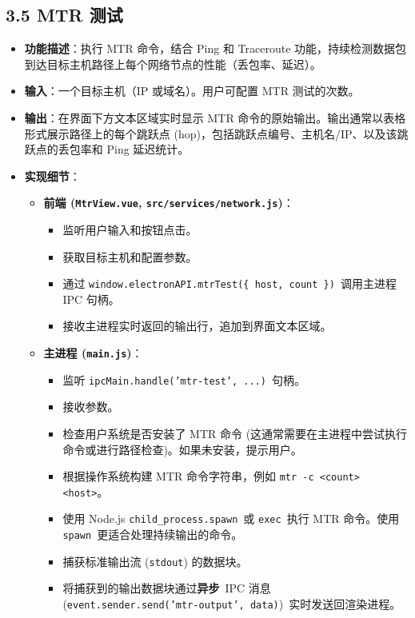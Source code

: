 \documentclass{article}
\begin{document}
\subsection*{3.5 MTR 测试}

\begin{itemize}
    \item \textbf{功能描述}：执行 MTR 命令，结合 Ping 和 Traceroute 功能，持续检测数据包到达目标主机路径上每个网络节点的性能（丢包率、延迟）。
    \item \textbf{输入}：一个目标主机（IP 或域名）。用户可配置 MTR 测试的次数。
    \item \textbf{输出}：在界面下方文本区域实时显示 MTR 命令的原始输出。输出通常以表格形式展示路径上的每个跳跃点 (hop)，包括跳跃点编号、主机名/IP、以及该跳跃点的丢包率和 Ping 延迟统计。
    \item \textbf{实现细节}：
    \begin{itemize}
        \item \textbf{前端 (\texttt{MtrView.vue}, \texttt{src/services/network.js})}：
        \begin{itemize}
            \item 监听用户输入和按钮点击。
            \item 获取目标主机和配置参数。
            \item 通过 \texttt{window.electronAPI.mtrTest(\{ host, count \})}\ 调用主进程 IPC 句柄。
            \item 接收主进程实时返回的输出行，追加到界面文本区域。
        \end{itemize}
        \item \textbf{主进程 (\texttt{main.js})}：
        \begin{itemize}
            \item 监听 \texttt{ipcMain.handle('mtr-test', ...)}\ 句柄。
            \item 接收参数。
            \item 检查用户系统是否安装了 MTR 命令 (这通常需要在主进程中尝试执行命令或进行路径检查)。如果未安装，提示用户。
            \item 根据操作系统构建 MTR 命令字符串，例如 \texttt{mtr -c <count> <host>}。
            \item 使用 Node.js \texttt{child\_process.spawn}\ 或 \texttt{exec}\ 执行 MTR 命令。使用 \texttt{spawn}\ 更适合处理持续输出的命令。
            \item 捕获标准输出流 (\texttt{stdout}) 的数据块。
            \item 将捕获到的输出数据块通过\textbf{异步}\ IPC 消息 (\texttt{event.sender.send('mtr-output', data)})\ 实时发送回渲染进程。

\end{itemize}
\end{itemize}
\end{itemize}
\end{document}
